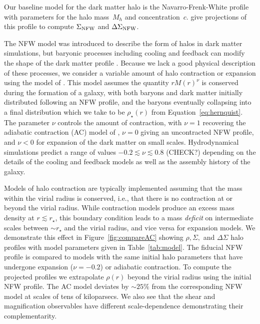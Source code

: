 \documentclass[12pt]{emulateapj}
\begin{document}
Our baseline model for the dark matter halo is the Navarro-Frenk-White
\citep[NFW, ][]{Navarro1996} profile with parameters for the halo
mass~$M_{h}$ and concentration~$c$. \citet{Wright2000} give
projections of this profile to compute $\Sigma_{\rm NFW}$ and
$\Delta\Sigma_{\rm NFW}$.

The NFW model was introduced to describe the form of halos in dark
matter simulations, but baryonic processes
including cooling and feedback can modify the shape of the dark matter
profile \citep[e.g.,][]{Blumenthal1986, Gao2004, Gnedin2004,
  Johansson2009, Abadi2010, Gnedin2011}. Because we lack a good
physical description of these processes, we consider a variable amount
of halo contraction or expansion using the model of
\citet{Dutton2007}. This model assumes the quantity $rM(r)^\nu$ is
conserved during the formation of a galaxy, with both baryons and dark
matter initially distributed following an NFW profile, and the baryons
eventually collapsing into a final distribution which we take to be
$\rho_{\star}(r)$ from Equation~\ref{eq:hernquist}. The parameter
$\nu$ controls the amount of contraction, with $\nu=1$ recovering the
adiabatic contraction (AC) model of \citet{Blumenthal1986}, $\nu=0$ giving an
uncontracted NFW profile, and $\nu<0$ for expansion of the dark matter
on small scales. Hydrodynamical simulations predict a range of values
$-0.2\lesssim \nu \lesssim 0.8$ (CHECK?) depending on the details of
the cooling and feedback models as well as the assembly history of the
galaxy.

Models of halo contraction are typically implemented
assuming that the mass within the virial radius is conserved, i.e.,
that there is no contraction at or beyond the virial radius. While
contraction models produce an excess mass density at $r \lesssim
r_{\star}$, this boundary condition leads to a mass \textit{deficit} on
intermediate scales between $\sim r_{\star}$ and the virial radius, and vice
versa for expansion models. We demonstrate this effect in
Figure~\ref{fig:compareAC} showing $\rho, \Sigma,$ and $\Delta\Sigma$
halo profiles with model parameters given in
Table~\ref{tab:model}. The fiducial NFW profile is compared to models
with the same initial halo 
parameters that have undergone expansion ($\nu=-0.2$) or adiabatic
contraction. To compute the projected profiles we extrapolate
$\rho(r)$ beyond the virial radius using the initial NFW profile. The AC model deviates
by $\sim25\%$ from the corresponding NFW model at scales of tens of
kiloparsecs. We also see that the shear and magnification observables have
different scale-dependence demonstrating their complementarity.
\end{document}
